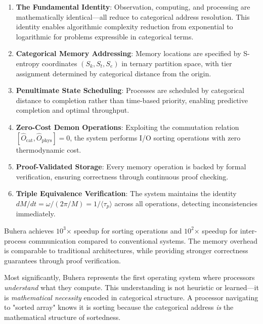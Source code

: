 \documentclass[twocolumn,10pt]{article}
\theoremstyle{definition}
\theoremstyle{remark}
\begin{document}
\begin{enumerate}
    \item \textbf{The Fundamental Identity}: Observation, computing, and processing are mathematically identical—all reduce to categorical address resolution. This identity enables algorithmic complexity reduction from exponential to logarithmic for problems expressible in categorical terms.

    \item \textbf{Categorical Memory Addressing}: Memory locations are specified by S-entropy coordinates $(S_k, S_t, S_e)$ in ternary partition space, with tier assignment determined by categorical distance from the origin.

    \item \textbf{Penultimate State Scheduling}: Processes are scheduled by categorical distance to completion rather than time-based priority, enabling predictive completion and optimal throughput.

    \item \textbf{Zero-Cost Demon Operations}: Exploiting the commutation relation $[\hat{O}_{\text{cat}}, \hat{O}_{\text{phys}}] = 0$, the system performs I/O sorting operations with zero thermodynamic cost.

    \item \textbf{Proof-Validated Storage}: Every memory operation is backed by formal verification, ensuring correctness through continuous proof checking.

    \item \textbf{Triple Equivalence Verification}: The system maintains the identity $dM/dt = \omega/(2\pi/M) = 1/\langle\tau_p\rangle$ across all operations, detecting inconsistencies immediately.
\end{enumerate}

Buhera achieves $10^3$× speedup for sorting operations and $10^2$× speedup for inter-process communication compared to conventional systems. The memory overhead is comparable to traditional architectures, while providing stronger correctness guarantees through proof verification.

Most significantly, Buhera represents the first operating system where processors \emph{understand} what they compute. This understanding is not heuristic or learned—it is \emph{mathematical necessity} encoded in categorical structure. A processor navigating to "sorted array" knows it is sorting because the categorical address \emph{is} the mathematical structure of sortedness.
\end{document}
